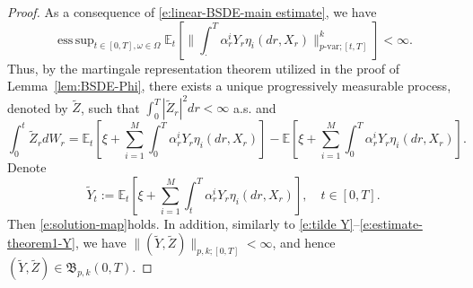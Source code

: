 \documentclass[11pt,reqno]{amsart}
\DeclareMathOperator*{\esssup}{ess\,sup}
\numberwithin{equation}{section}
\begin{document}
\begin{proof}
As a consequence of \eqref{e:linear-BSDE-main estimate}, we have 
\begin{equation*}
\esssup_{t\in[0,T],\omega\in\Omega}\mathbb{E}_{t}\left[\Big\|\int_{\cdot}^{T}\alpha^{i}_{r}Y_{r}\eta_{i}(dr,X_{r})\Big\|^{k}_{p\text{-var};[t,T]}\right]<\infty.
\end{equation*}
Thus, by the martingale representation theorem utilized in the proof of Lemma~\ref{lem:BSDE-Phi}, there exists a unique 
progressively measurable process, denoted by $\tilde{Z}$, such that $\int_{0}^{T}|\tilde{Z}_{r}|^{2}dr<\infty$ a.s. and 
\begin{equation}\label{e:tildeZ}
\int_0^t \tilde{Z}_{r}dW_{r} =  \mathbb{E}_{t}\left[\xi + \sum_{i=1}^{M}\int_{0}^{T}\alpha^{i}_{r}Y_{r}\eta_{i}(dr,X_{r})\right] - \mathbb{E}\left[\xi + \sum_{i=1}^{M}\int_{0}^{T}\alpha^{i}_{r}Y_{r}\eta_{i}(dr,X_{r})\right].
\end{equation} 
Denote
\begin{equation}\label{e:tildeY}
\tilde{Y}_{t} := \mathbb{E}_{t}\left[\xi + \sum_{i=1}^{M}\int_{t}^{T}\alpha^{i}_{r}Y_{r}\eta_{i}(dr,X_{r})\right],\quad t\in[0,T].
\end{equation}
Then \eqref{e:solution-map}holds. In addition, similarly to
\eqref{e:tilde Y}--\eqref{e:estimate-theorem1-Y}, we have $\|(\tilde{Y},\tilde{Z})\|_{p,k;[0,T]}<\infty$, and hence $(\tilde Y, \tilde Z)\in \mathfrak B_{p,k}(0,T)$. 


\end{proof}
\end{document}
